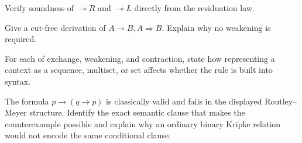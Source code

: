 \begin{exercise}
\label{ex:relevance-linear-01}
Verify soundness of \(\multimap R\) and \(\multimap L\) directly from the
residuation law.
\end{exercise}

\begin{exercise}
\label{ex:relevance-linear-02}
Give a cut-free derivation of
\(A\multimap B,A\Rightarrow B\).  Explain why no weakening is required.
\end{exercise}

\begin{exercise}
\label{ex:relevance-linear-03}
For each of exchange, weakening, and contraction, state how representing a
context as a sequence, multiset, or set affects whether the rule is built into
syntax.
\end{exercise}

\begin{exercise}
\label{ex:relevance-linear-04}
The formula \(p\to(q\to p)\) is classically valid and fails in the displayed
Routley--Meyer structure.  Identify the exact semantic clause that makes the
counterexample possible and explain why an ordinary binary Kripke relation would
not encode the same conditional clause.
\end{exercise}
